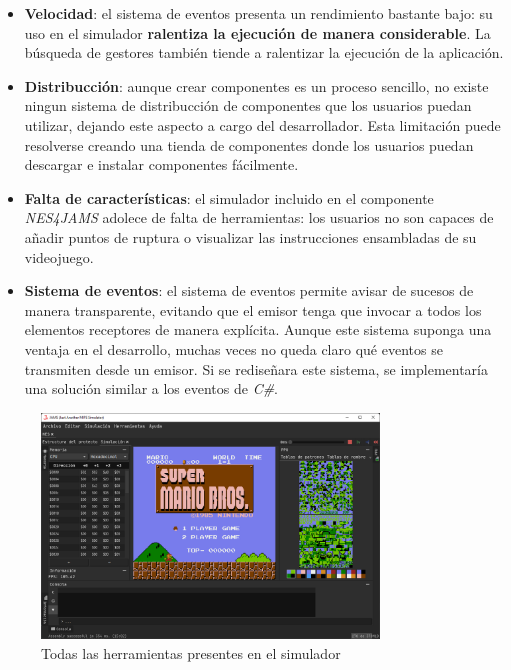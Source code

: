 \begin{itemize}
    \item \textbf{Velocidad}: el sistema de eventos
    presenta un rendimiento bastante bajo: su uso
    en el simulador \textbf{ralentiza la ejecución
    de manera considerable}.
    La búsqueda de gestores también tiende a ralentizar
    la ejecución de la aplicación.
    \item \textbf{Distribucción}: aunque crear componentes
    es un proceso sencillo, no existe ningun sistema de
    distribucción de componentes que los usuarios puedan
    utilizar, dejando este aspecto a cargo del desarrollador.
    Esta limitación puede resolverse creando una tienda de
    componentes donde los usuarios puedan descargar e instalar
    componentes fácilmente.
    \item \textbf{Falta de características}: el simulador
    incluido en el componente \textit{NES4JAMS} adolece
    de falta de herramientas: los usuarios no son
    capaces de añadir puntos de ruptura o visualizar
    las instrucciones ensambladas de su videojuego.
    \item \textbf{Sistema de eventos}: el sistema de eventos
    permite avisar de sucesos de manera transparente, evitando
    que el emisor tenga que invocar a todos los elementos
    receptores de manera explícita.
    Aunque este sistema suponga una ventaja en el desarrollo,
    muchas veces no queda claro qué eventos se transmiten desde
    un emisor.
    Si se rediseñara este sistema, se implementaría
    una solución similar a los eventos de \textit{C\#}.
\end{itemize}

\begin{figure}[h]
    \centering
    \includegraphics[width=0.8\textwidth]{images/conclusions/nes-simulator-tools}
    \caption{Todas las herramientas presentes en el simulador}
    \label{fig:nes-conclusions-tools}
\end{figure}

